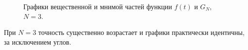 \documentclass[a5paper, 10pt]{article}
\theoremstyle{definition}
\theoremstyle{plain}
\theoremstyle{remark}
\begin{document}
\begin{figure}[h]
\begin{minipage}[h]{0.5\linewidth}
\end{minipage}
\hfill
\begin{minipage}[h]{0.5\linewidth}
\end{minipage}
\caption{Графики вещественной и мнимой частей функции $f(t)$ и $G_N$, $N=3$.}
\end{figure}

При $N=3$ точность существенно возрастает и графики практически идентичны, за исключением углов.
\end{document}

